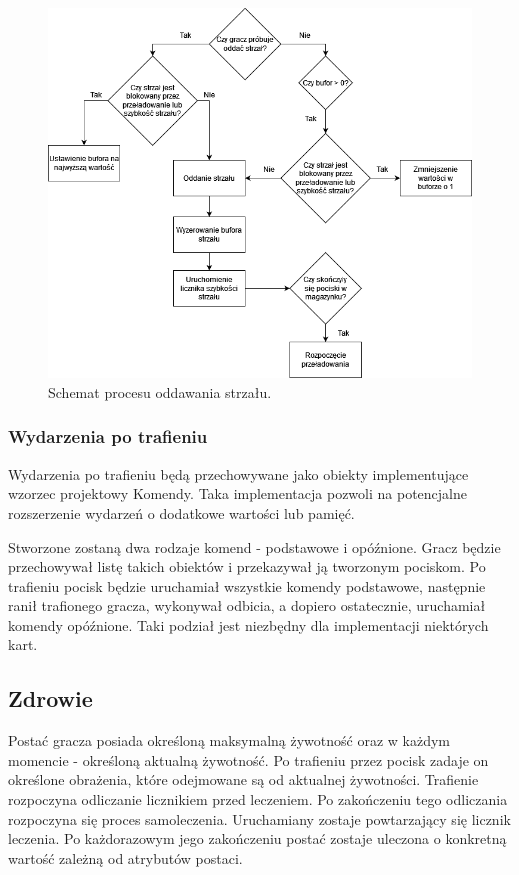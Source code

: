 \begin{figure}
    \centering
    \includegraphics[width=.8\linewidth]{Images/design/ShootFlowchart(1).png}
    \caption{Schemat procesu oddawania strzału.}
    \label{fig:shoot_flowchart}
\end{figure}

\subsubsection{Wydarzenia po trafieniu}
Wydarzenia po trafieniu będą przechowywane jako obiekty implementujące wzorzec projektowy Komendy\cite{game_programming_patterns}. Taka implementacja pozwoli na potencjalne rozszerzenie wydarzeń o dodatkowe wartości lub pamięć. 

Stworzone zostaną dwa rodzaje komend - podstawowe i opóźnione. Gracz będzie przechowywał listę takich obiektów i przekazywał ją tworzonym pociskom. Po trafieniu pocisk będzie uruchamiał wszystkie komendy podstawowe, następnie ranił trafionego gracza, wykonywał odbicia, a dopiero ostatecznie, uruchamiał komendy opóźnione. Taki podział jest niezbędny dla implementacji niektórych kart.

\subsection{Zdrowie}
Postać gracza posiada określoną maksymalną żywotność oraz w każdym momencie - określoną aktualną żywotność. Po trafieniu przez pocisk zadaje on określone obrażenia, które odejmowane są od aktualnej żywotności. Trafienie rozpoczyna odliczanie licznikiem przed leczeniem. Po zakończeniu tego odliczania rozpoczyna się proces samoleczenia. Uruchamiany zostaje powtarzający się licznik leczenia. Po każdorazowym jego zakończeniu postać zostaje uleczona o konkretną wartość zależną od atrybutów postaci.

